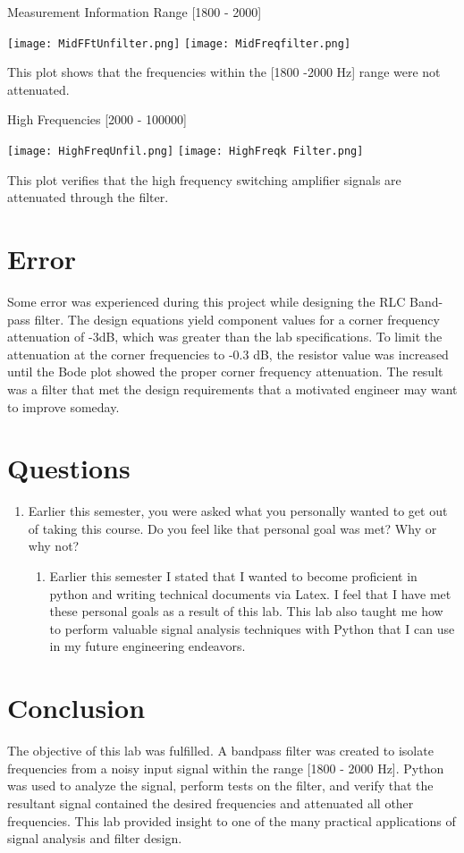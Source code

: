 \documentclass[hidelinks, 12pt]{report}
\begin{document}
Measurement Information Range [1800 - 2000]

    \texttt{[image: MidFFtUnfilter.png]}
    \texttt{[image: MidFreqfilter.png]}    

This plot shows that the frequencies within the [1800 -2000 Hz] range were not attenuated.

High Frequencies [2000 - 100000]

    \texttt{[image: HighFreqUnfil.png]}
    \texttt{[image: HighFreqk Filter.png]}  
    
This plot verifies that the high frequency switching amplifier signals are attenuated through the filter.
\section{Error}

Some error was experienced during this project while designing the RLC Band-pass filter. The design equations yield component values for a corner frequency attenuation of -3dB, which was greater than the lab specifications. To limit the attenuation at the corner frequencies to -0.3 dB, the resistor value was increased until the Bode plot showed the proper corner frequency attenuation. The result was a filter that met the design requirements that a motivated engineer may want to improve someday. 


\section{Questions}

\begin{enumerate}
    \item Earlier this semester, you were asked what you personally wanted to get out of taking this
course. Do you feel like that personal goal was met? Why or why not?
    \begin{enumerate}
        \item Earlier this semester I stated that I wanted to become proficient in python and writing technical documents via Latex. I feel that I have met these personal goals as a result of this lab. This lab also taught me how to perform valuable signal analysis techniques with Python that I can use in my future engineering endeavors.
    \end{enumerate}
    
\end{enumerate}

\section{Conclusion}
The objective of this lab was fulfilled. A bandpass filter was created to isolate frequencies from a noisy input signal within the range [1800 - 2000 Hz]. Python was used to analyze the signal, perform tests on the filter, and verify that the resultant signal contained the desired frequencies and attenuated all other frequencies. This lab provided insight to one of the many practical applications of signal analysis and filter design.
\end{document}
